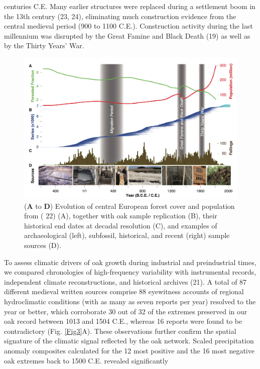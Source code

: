 \documentclass[10pt,a4paper,twoside,onecolumn]{article}
\begin{document}
\begin{myfont}
\begin{multicols}{3}
centuries C.E. Many earlier structures were replaced during a settlement boom in the 13th century (23, 24), eliminating much construction
evidence from the central medieval period (900 to 1100 C.E.). Construction activity during the last millennium was disrupted by the Great Famine
and Black Death (19) as well as by the Thirty Years’ War. \par
	\end{multicols}	
\begin{figure}[h]
\includegraphics[width=1\textwidth]{BuntgenFig2}
\caption{(\textbf{A} to \textbf{D}) Evolution of central European forest cover and population from ( 22) (A), together with oak sample replication (B), their historical end dates at decadal resolution (C), and examples of archaeological (left), subfossil, historical, and recent (right) sample sources (D).} 
\label{Fig2} 
\end{figure}
	\begin{multicols}{3}
To assess climatic drivers of oak growth during industrial and preindustrial times, we compared chronologies of high-frequency variability
with instrumental records, independent climate reconstructions, and historical archives (21). A total of 87 different medieval written sources
comprise 88 eyewitness accounts of regional hydroclimatic conditions (with as many as seven reports per year) resolved to the year or better,
which corroborate 30 out of 32 of the extremes preserved in our oak record between 1013 and 1504 C.E., whereas 16 reports were found to be
contradictory (Fig. \ref{Fig3}A). These observations further confirm the spatial signature of the climatic signal reflected by the oak network. Scaled precipitation
anomaly composites calculated for the 12 most positive and the 16 most negative oak extremes back to 1500 C.E. revealed significantly

\end{multicols}
\end{myfont}
\end{document}
